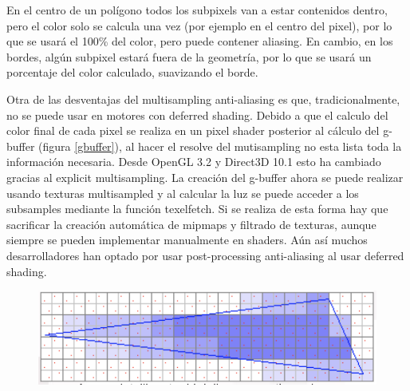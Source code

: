 \documentclass[withindex, glossary]{cam-thesis}
\begin{document}
En el centro de un polígono todos los subpixels van a estar contenidos dentro, pero el color solo se calcula una vez (por ejemplo en el centro del pixel), por lo que se usará el 100\% del color, pero puede contener aliasing. En cambio, en los bordes, algún subpixel estará fuera de la geometría, por lo que se usará un porcentaje del color calculado, suavizando el borde.

Otra de las desventajas del multisampling anti-aliasing es que, tradicionalmente, no se puede usar en motores con deferred shading. Debido a que el calculo del color final de cada pixel se realiza en un pixel shader posterior al cálculo del g-buffer (figura \ref{gbuffer}), al hacer el resolve del mutisampling no esta lista toda la información necesaria. Desde OpenGL 3.2 y Direct3D 10.1 esto ha cambiado gracias al explicit multisampling\cite{textureMultisample}. La creación del g-buffer ahora se puede realizar usando texturas multisampled y al calcular la luz se puede acceder a los subsamples mediante la función texelfetch. Si se realiza de esta forma hay que sacrificar la creación automática de mipmaps y filtrado de texturas, aunque siempre se pueden implementar manualmente en shaders. Aún así muchos desarrolladores han optado por usar post-processing anti-aliasing al usar deferred shading.

\begin{figure}[!htbp]
    \includegraphics[width=.8\linewidth]{figures/msaasample.png}
    \caption{}
    \label{msaasample}
\end{figure}
\end{document}
